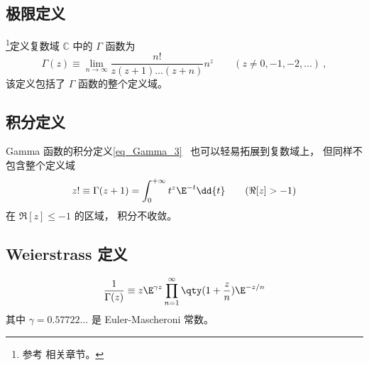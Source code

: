 

\subsection{极限定义}
\footnote{参考 \cite{Arfken} 相关章节。}定义复数域 $\mathbb C$ 中的 $\Gamma$ 函数为
\begin{equation}
\Gamma(z) \equiv \lim_{n\to\infty} \frac{n!}{z(z+1)\dots(z+n)}n^z \qquad (z \ne 0, -1, -2,\dots)~,
\end{equation}
该定义包括了 $\Gamma$ 函数的整个定义域。

\subsection{积分定义}
Gamma 函数的积分定义\autoref{eq_Gamma_3}~ 也可以轻易拓展到复数域上， 但同样不包含整个定义域
\begin{equation}
z! \equiv \Gamma (z + 1) = \int_0^{+\infty} t^z \E^{-t} \dd{t} \qquad (\Re[z] > -1)
\end{equation}
在 $\Re[z] \leqslant -1$ 的区域， 积分不收敛。

\subsection{Weierstrass 定义}
\begin{equation}
\frac{1}{\Gamma(z)} \equiv z \E^{\gamma z} \prod_{n=1}^\infty \qty(1 + \frac{z}{n}) \E^{-z/n}
\end{equation}
其中 $\gamma = 0.57722\dots$ 是 Euler-Mascheroni 常数。
